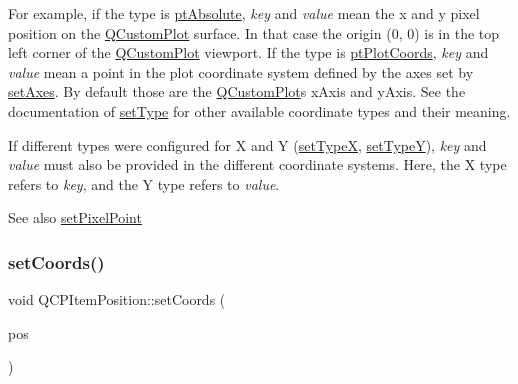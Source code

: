 For example, if the type is \mbox{\hyperlink{class_q_c_p_item_position_aad9936c22bf43e3d358552f6e86dbdc8a564f5e53e550ead1ec5fc7fc7d0b73e0}{pt\+Absolute}}, {\itshape key} and {\itshape value} mean the x and y pixel position on the \mbox{\hyperlink{class_q_custom_plot}{Q\+Custom\+Plot}} surface. In that case the origin (0, 0) is in the top left corner of the \mbox{\hyperlink{class_q_custom_plot}{Q\+Custom\+Plot}} viewport. If the type is \mbox{\hyperlink{class_q_c_p_item_position_aad9936c22bf43e3d358552f6e86dbdc8ad5ffb8dc99ad73263f7010c77342294c}{pt\+Plot\+Coords}}, {\itshape key} and {\itshape value} mean a point in the plot coordinate system defined by the axes set by \mbox{\hyperlink{class_q_c_p_item_position_a2185f45c75ac8cb9be89daeaaad50e37}{set\+Axes}}. By default those are the \mbox{\hyperlink{class_q_custom_plot}{Q\+Custom\+Plot}}\textquotesingle{}s x\+Axis and y\+Axis. See the documentation of \mbox{\hyperlink{class_q_c_p_item_position_aa476abf71ed8fa4c537457ebb1a754ad}{set\+Type}} for other available coordinate types and their meaning.

If different types were configured for X and Y (\mbox{\hyperlink{class_q_c_p_item_position_a2113b2351d6d00457fb3559a4e20c3ea}{set\+TypeX}}, \mbox{\hyperlink{class_q_c_p_item_position_ac2a454aa5a54c1615c50686601ec4510}{set\+TypeY}}), {\itshape key} and {\itshape value} must also be provided in the different coordinate systems. Here, the X type refers to {\itshape key}, and the Y type refers to {\itshape value}.

\begin{DoxySeeAlso}{See also}
\mbox{\hyperlink{class_q_c_p_item_position_ab404e56d9ac2ac2df0382c57933a71ef}{set\+Pixel\+Point}} 
\end{DoxySeeAlso}
\mbox{\label{class_q_c_p_item_position_acc70b3abc143287f806e5f154e5e07b0}} 
\subsubsection{\texorpdfstring{set\+Coords()}{setCoords()}\hspace{0.1cm}{\footnotesize\ttfamily [2/2]}}
{\footnotesize\ttfamily void Q\+C\+P\+Item\+Position\+::set\+Coords (\begin{DoxyParamCaption}\item[{const Q\+PointF \&}]{pos }\end{DoxyParamCaption})}

